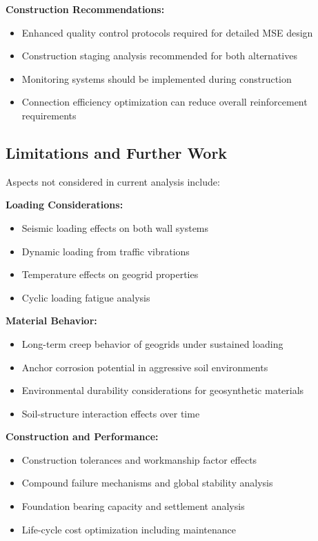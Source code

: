\documentclass[10pt,a4paper,twocolumn]{article}
\begin{document}
\textbf{Construction Recommendations:}
\begin{itemize}
\item Enhanced quality control protocols required for detailed MSE design
\item Construction staging analysis recommended for both alternatives
\item Monitoring systems should be implemented during construction
\item Connection efficiency optimization can reduce overall reinforcement requirements
\end{itemize}

\subsection{Limitations and Further Work}

Aspects not considered in current analysis include:

\textbf{Loading Considerations:}
\begin{itemize}
\item Seismic loading effects on both wall systems
\item Dynamic loading from traffic vibrations
\item Temperature effects on geogrid properties
\item Cyclic loading fatigue analysis
\end{itemize}

\textbf{Material Behavior:}
\begin{itemize}
\item Long-term creep behavior of geogrids under sustained loading
\item Anchor corrosion potential in aggressive soil environments
\item Environmental durability considerations for geosynthetic materials
\item Soil-structure interaction effects over time
\end{itemize}

\textbf{Construction and Performance:}
\begin{itemize}
\item Construction tolerances and workmanship factor effects
\item Compound failure mechanisms and global stability analysis
\item Foundation bearing capacity and settlement analysis
\item Life-cycle cost optimization including maintenance
\end{itemize}
\end{document}
